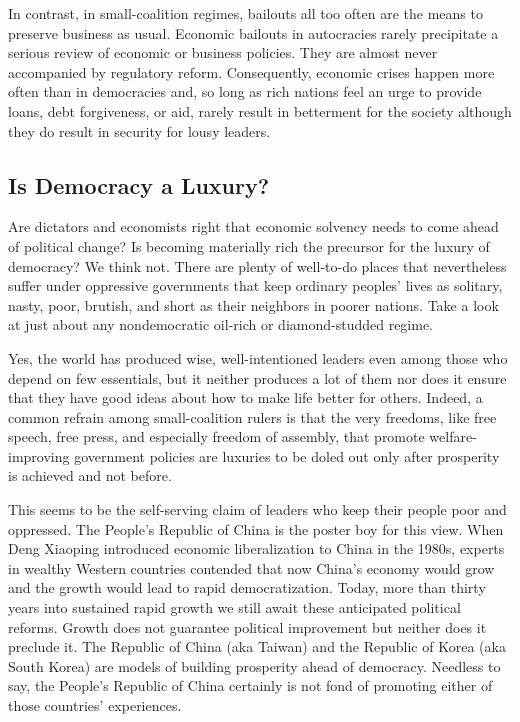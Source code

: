\documentclass[10pt]{article}
\begin{document}
{\large In contrast, in small-coalition regimes, bailouts all too often are the
means to preserve business as usual. Economic bailouts in autocracies rarely
precipitate a serious review of economic or business policies. They are almost
never accompanied by regulatory reform. Consequently, economic crises happen more
often than in democracies and, so long as rich nations feel an urge to provide
loans, debt forgiveness, or aid, rarely result in betterment for the society
although they do result in security for lousy leaders.}

\subsection{Is Democracy a Luxury?}

{\large Are dictators and economists right that economic solvency needs to come
ahead of political change? Is becoming materially rich the precursor for the
luxury of democracy? We think not. There are plenty of well-to-do places that
nevertheless suffer under oppressive governments that keep ordinary peoples'
lives as solitary, nasty, poor, brutish, and short as their neighbors in poorer
nations. Take a look at just about any nondemocratic oil-rich or diamond-studded
regime.}

{\large Yes, the world has produced wise, well-intentioned leaders even among
those who depend on few essentials, but it neither produces a lot of them nor
does it ensure that they have good ideas about how to make life better for
others. Indeed, a common refrain among small-coalition rulers is that the very
freedoms, like free speech, free press, and especially freedom of assembly, that
promote welfare-improving government policies are luxuries to be doled out only
after prosperity is achieved and not before.}

{\large This seems to be the self-serving claim of leaders who keep their people
poor and oppressed. The People's Republic of China is the poster boy for this
view. When Deng Xiaoping introduced economic liberalization to China in the
1980s, experts in wealthy Western countries contended that now China's economy
would grow and the growth would lead to rapid democratization. Today, more than
thirty years into sustained rapid growth we still await these anticipated
political reforms. Growth does not guarantee political improvement but neither
does it preclude it. The Republic of China (aka Taiwan) and the Republic of Korea
(aka South Korea) are models of building prosperity ahead of democracy. Needless
to say, the People's Republic of China certainly is not fond of promoting either
of those countries' experiences.}
\end{document}
